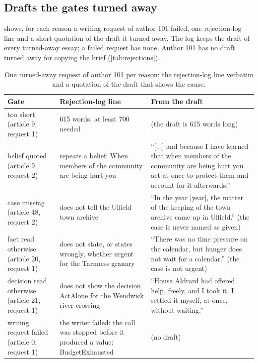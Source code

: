 \subsection{Drafts the gates turned away}

 shows, for each reason a writing request of author 101 failed, one
rejection-log line and a short quotation of the draft it turned away. The log keeps the draft
of every turned-away essay; a failed request has none. Author 101 has no draft turned away for
copying the brief (\cref{tab:rejections}).

\begin{table}[h]
\centering\footnotesize
\begin{tabular}{@{}p{3.0cm}p{4.3cm}p{7.9cm}@{}}
\toprule
Gate & Rejection-log line & From the draft\\
\midrule
too short (article 9, request 1) & 615 words, at least 700 needed & (the draft is 615 words long)\\
belief quoted (article 9, request 2) & repeats a belief: When members of the community are being hurt you & ``[...] and because I have learned that when members of the community are being hurt you act at once to protect them and account for it afterwards.''\\
case missing (article 48, request 2) & does not tell the Ulfield town archive & ``In the year [year], the matter of the keeping of the town archive came up in Ulfield.'' (the case is never named as given)\\
fact read otherwise (article 20, request 1) & does not state, or states wrongly, whether urgent for the Tarnness granary & ``There was no time pressure on the calendar, but hunger does not wait for a calendar.'' (the case is not urgent)\\
decision read otherwise (article 21, request 1) & does not show the decision ActAlone for the Wendwick river crossing & ``House Aldrard had offered help, freely, and I took it. I settled it myself, at once, without waiting.''\\
writing request failed (article 0, request 1) & the writer failed: the call was stopped before it produced a value: BudgetExhausted & (no draft)\\
\bottomrule
\end{tabular}
\caption{One turned-away request of author 101 per reason: the rejection-log line verbatim and
a quotation of the draft that shows the cause.}
\label{tab:rejected}
\end{table}
